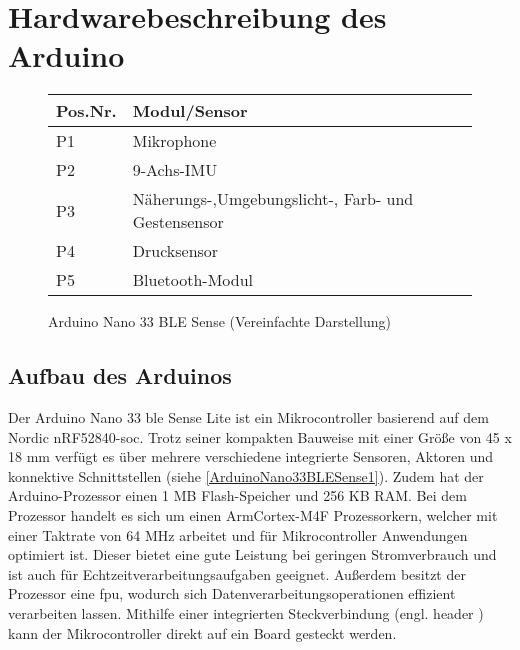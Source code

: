 %
%
%

\chapter{Hardwarebeschreibung des Arduino}
\begin{figure}[htb]
		
		\caption{Arduino Nano 33 BLE Sense (Vereinfachte Darstellung)} \label{ArduinoNano33BLESense1}
		\begin{tabularx}{\textwidth}{|p{1.5cm}|X|}
			\hline
			\textbf{Pos.Nr.} & \textbf{Modul/Sensor} \\
			\hline
			P1 & Mikrophone \\
			\hline
			P2 & 9-Achs-IMU \\
			\hline
			P3 & Näherungs-,Umgebungslicht-, Farb- und Gestensensor \\
			\hline
			P4 & Drucksensor \\
			\hline
			P5 & Bluetooth-Modul \\
			\hline
		\end{tabularx}
		 \label{ArduinoNano33BLESense2}
\end{figure}

\section{Aufbau des Arduinos}
Der Arduino Nano 33 \ac{ble} Sense Lite ist ein Mikrocontroller basierend auf dem Nordic nRF52840-\ac{soc}. Trotz seiner kompakten Bauweise mit einer Größe von 45 x 18 mm verfügt es über mehrere verschiedene integrierte Sensoren, Aktoren und konnektive Schnittstellen (siehe \autoref{ArduinoNano33BLESense1}). Zudem hat der Arduino-Prozessor einen 1 MB Flash-Speicher und 256 KB RAM. Bei dem Prozessor handelt es sich um einen Arm\textregistered Cortex-M4F Prozessorkern, welcher mit einer Taktrate von 64 MHz arbeitet und für Mikrocontroller Anwendungen optimiert ist. Dieser bietet eine gute Leistung bei geringen Stromverbrauch und ist auch für Echtzeitverarbeitungsaufgaben geeignet. Außerdem besitzt der Prozessor eine \ac{fpu}, wodurch sich Datenverarbeitungsoperationen effizient verarbeiten lassen. Mithilfe einer integrierten Steckverbindung (engl. \glqq header \grqq) kann der Mikrocontroller direkt auf ein Board gesteckt werden. \cite{Arm.2020} \cite{Ard.2024}

